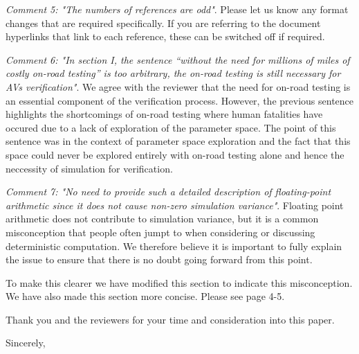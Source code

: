 \documentclass[11pt, a4paper]{letter} %
\renewcommand{\closing}[1]{
	\vspace{2.5mm} %
	\noindent %
	\hspace*{\longindentation} %
	\parbox{\indentedwidth}{
		\raggedright
		#1 %
		\vskip 1.65cm %
		\fromsig %
	}
}
\begin{document}
\begin{letter}
\textit{Comment 5: "The numbers of references are odd"}.
Please let us know any format changes that are required specifically. If you are referring to the document hyperlinks that link to each reference, these can be switched off if required.

\textit{Comment 6: "In section I, the sentence “without the need for millions of miles of costly on-road testing” is too arbitrary, the on-road testing is still necessary for AVs verification"}.
We agree with the reviewer that the need for on-road testing is an essential component of the verification process. However, the previous sentence highlights the shortcomings of on-road testing where human fatalities have occured due to a lack of exploration of the parameter space.
The point of this sentence  was in the context of parameter space exploration and the fact that this space could never be explored entirely with on-road testing alone and hence the neccessity of simulation for verification.

\textit{Comment 7: "No need to provide such a detailed description of floating-point arithmetic since it does not cause non-zero simulation variance"}.
Floating point arithmetic does not contribute to simulation variance, but it is a common misconception that people often jumpt to when considering or discussing deterministic computation. We therefore believe it is important to fully explain the issue to ensure that there is no doubt going forward from this point.

To make this clearer we have modified this section to indicate this misconception. We have also made this section more concise. Please see page 4-5.










Thank you and the reviewers for your time and consideration into this paper. 

\closing{Sincerely,}






\end{letter}
\end{document}
